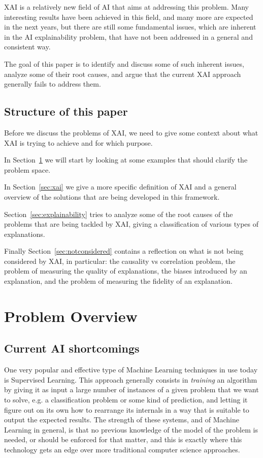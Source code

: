 \documentclass[conference]{IEEEtran}
\begin{document}
XAI is a relatively new field of AI that aims at addressing this problem. Many
interesting results have been achieved in this field, and many more are expected
in the next years, but there are still some fundamental issues, which are
inherent in the AI explainability problem, that have not been addressed in a
general and consistent way.

The goal of this paper is to identify and discuss some of such inherent issues,
analyze some of their root causes, and argue that the current XAI approach
generally fails to address them.

\subsection{Structure of this paper}
\label{sec:structure}

Before we discuss the problems of XAI, we need to give some context about what
XAI is trying to achieve and for which purpose.

In Section~\ref{sec:problem} we will start by looking at some examples that
should clarify the problem space.

In Section~\ref{sec:xai} we give a more specific definition of XAI and a general
overview of the solutions that are being developed in this framework.

Section~\ref{sec:explainability} tries to analyze some of the root causes of the
problems that are being tackled by XAI, giving a classification of various types
of explanations.

Finally Section~\ref{sec:notconsidered} contains a reflection on what is not
being considered by XAI, in particular: the causality vs correlation problem,
the problem of measuring the quality of explanations, the biases introduced by
an explanation, and the problem of measuring the fidelity of an explanation.

\section{Problem Overview}
\label{sec:problem}

\subsection{Current AI shortcomings}
\label{sec:aifails}

One very popular and effective type of Machine Learning techniques in use today
is Supervised Learning. This approach generally consists in \textit{training} an
algorithm by giving it as input a large number of instances of a given problem
that we want to solve, e.g. a classification problem or some kind of prediction,
and letting it figure out on its own how to rearrange its internals in a way
that is suitable to output the expected results. The strength of these systems,
and of Machine Learning in general, is that no previous knowledge of the model
of the problem is needed, or should be enforced for that matter, and this is
exactly where this technology gets an edge over more traditional computer
science approaches.
\end{document}
